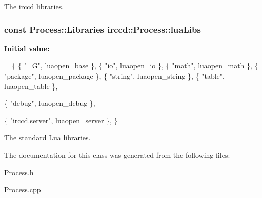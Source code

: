 The irccd libraries. \hypertarget{a00052_a453e4ca0e54bc896b7543117cfdf8670}{
\subsubsection[{lua\-Libs}]{\setlength{\rightskip}{0pt plus 5cm}const {\bf Process\-::\-Libraries} irccd\-::\-Process\-::lua\-Libs\hspace{0.3cm}{\ttfamily [static]}}}\label{a00052_a453e4ca0e54bc896b7543117cfdf8670}
{\bfseries Initial value\-:}
\begin{DoxyCode}
= \{
    \{ \textcolor{stringliteral}{"\_G"},             luaopen\_base        \},
    \{ \textcolor{stringliteral}{"io"},             luaopen\_io      \},
    \{ \textcolor{stringliteral}{"math"},           luaopen\_math        \},
    \{ \textcolor{stringliteral}{"package"},            luaopen\_package     \},
    \{ \textcolor{stringliteral}{"string"},         luaopen\_string      \},
    \{ \textcolor{stringliteral}{"table"},          luaopen\_table       \},


    \{ \textcolor{stringliteral}{"debug"},          luaopen\_debug       \},


    
    \{ \textcolor{stringliteral}{"irccd.server"},       luaopen\_server      \},
\}
\end{DoxyCode}
The standard Lua libraries. 

The documentation for this class was generated from the following files\-:\begin{DoxyCompactItemize}
\item 
\hyperlink{a00123}{Process.\-h}\item 
Process.\-cpp\end{DoxyCompactItemize}
